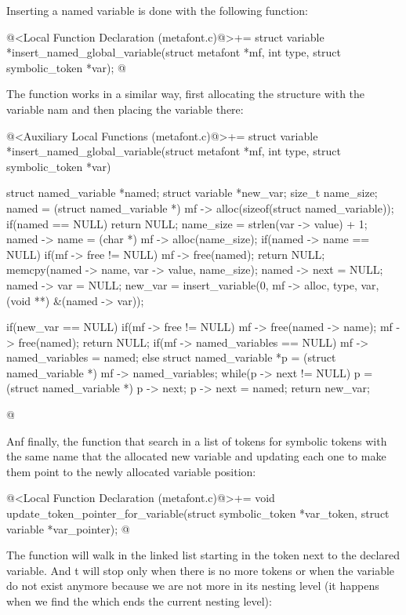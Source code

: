 Inserting a named variable is done with the following function:

\iniciocodigo
@<Local Function Declaration (metafont.c)@>+=
struct variable *insert_named_global_variable(struct metafont *mf,
                                             int type,
                                             struct symbolic_token *var);
@
\fimcodigo

The function works in a similar way, first allocating the structure
with the variable nam and then placing the variable there:

\iniciocodigo
@<Auxiliary Local Functions (metafont.c)@>+=
struct variable *insert_named_global_variable(struct metafont *mf,
                                             int type,
                                             struct symbolic_token *var){
  struct named_variable *named;
  struct variable *new_var;
  size_t name_size;
  named = (struct named_variable *)
              mf -> alloc(sizeof(struct named_variable));
  if(named == NULL)
    return NULL;
  name_size = strlen(var -> value) + 1;
  named -> name = (char *) mf -> alloc(name_size);
  if(named -> name == NULL){
    if(mf -> free != NULL)
      mf -> free(named);
    return NULL;
  }
  memcpy(named -> name, var -> value, name_size);
  named -> next = NULL;
  named -> var = NULL;
  new_var = insert_variable(0, mf -> alloc, type, var,
                           (void **) &(named -> var));

  if(new_var == NULL){
    if(mf -> free != NULL){
      mf -> free(named -> name);
      mf -> free(named);
      return NULL;
    }
  }
  if(mf -> named_variables == NULL)
    mf -> named_variables = named;
  else{
    struct named_variable *p = (struct named_variable *)
                                   mf -> named_variables;
    while(p -> next != NULL)
      p = (struct named_variable *) p -> next;
    p -> next = named;
  }
  return new_var;
}
@
\fimcodigo

Anf finally, the function that search in a list of tokens for symbolic
tokens with the same name that the allocated new variable and updating
each one to make them point to the newly allocated variable position:

\iniciocodigo
@<Local Function Declaration (metafont.c)@>+=
void update_token_pointer_for_variable(struct symbolic_token *var_token,
                                      struct variable *var_pointer);
@
\fimcodigo

The function will walk in the linked list starting in the token next
to the declared variable. And t will stop only when there is no more
tokens or when the variable do not exist anymore because we are not
more in its nesting level (it happens when we find
the  which ends the current nesting level):

